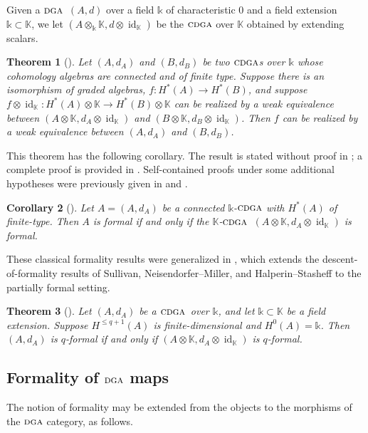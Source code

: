 \documentclass{article}
\numberwithin{equation}{section}
\newtheorem{theorem}{Theorem}[section]
\newtheorem{corollary}[theorem]{Corollary}
\theoremstyle{definition}
\newcommand{\K}{\mathbb{K}}
\renewcommand{\k}{\mathbb{k}}
\newcommand{\dga}{\ensuremath{\textsc{dga}}}
\newcommand{\cdga}{\ensuremath{\textsc{cdga}}}
\DeclareMathOperator{\id}{id}
\begin{document}
Given a $\dga$~$(A,d)$ over a field $\k$ of characteristic $0$ 
and a field extension $\k\subset \K$, we let $(A\otimes_{\k} \K, d\otimes \id_\K)$ 
be the $\cdga$ over $\K$ obtained by extending scalars.

\begin{theorem}[\cite{HS79}] %
\label{thm:Halperin-Stasheff}
Let $(A,d_A)$ and $(B,d_B)$ be two $\cdga$s over $\k$ 
whose cohomology algebras are connected and of finite type. 
Suppose there is an isomorphism of graded algebras, $f\colon H^{*}(A)\to H^{*}(B)$, 
and suppose  $f\otimes \id_{\K}\colon H^{*}(A)\otimes \K\to H^{*}(B)\otimes \K$
can be realized by a weak equivalence between $(A\otimes \K,d_A\otimes \id_{\K})$ 
and $(B\otimes \K,d_B\otimes \id_{\K})$. Then $f$ can be realized
by a weak equivalence between $(A,d_A)$ and $(B,d_B)$.
\end{theorem}

This theorem has the following corollary. The result is stated without proof 
in \cite[Corollary 6.9]{HS79}; a complete proof is provided in 
\cite[Corollary 4.17]{SW-forum}. Self-contained proofs under 
some additional hypotheses were previously given 
in \cite[Theorem 12.1] {Sullivan77} and \cite[Corollary~5.2]{NM78}.

\begin{corollary}[\cite{HS79}]
\label{cor:Kformal}
Let $A=(A,d_A)$ be a connected $\k$-$\cdga$ with $H^{*}(A)$ of finite-type. 
Then $A$ is formal if and only if the $\K$-$\cdga$~$(A\otimes \K,d_A\otimes \id_{\K})$ 
is formal.
\end{corollary}

These classical formality results were generalized in \cite[Theorem 4.19]{SW-forum}, 
which extends the descent-of-formality results of Sullivan, Neisendorfer--Miller, 
and Halperin--Stasheff to the partially formal setting.

\begin{theorem}[\cite{SW-forum}]
\label{thm:i-formalField}
Let $(A,d_A)$ be a $\cdga$~over $\k$, and let $\k\subset \K$ be a 
field extension. Suppose $H^{\le q+1}(A)$ is finite-dimensional 
and $H^0(A)=\k$.  Then $(A,d_A)$ is $q$-formal 
if and only if $(A\otimes \K,d_A\otimes \id_{\K})$ 
is $q$-formal.
\end{theorem}

\subsection{Formality of $\dga$ maps}
\label{subsec:formal-dga-maps} 
The notion of formality may be extended from the objects to the morphisms 
of the $\dga$ category, as follows.
\end{document}
